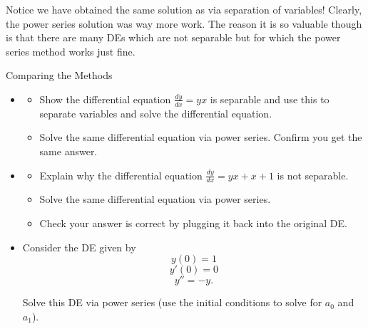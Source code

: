 Notice we have obtained the same solution as via separation of variables!  Clearly, the power series solution was way more work.  The reason it is so valuable though is that there are many DEs which are not separable but for which the power series method works just fine.
\begin{exercise}{Comparing the Methods \Coffeecup \Coffeecup \Coffeecup}
\begin{itemize}
\item \begin{itemize}
\item Show the differential equation $\frac{dy}{dx}=yx$ is separable and use this to separate variables and solve the differential equation.

\vspace*{2in}

\item Solve the same differential equation via power series. Confirm you get the same answer.

\vspace*{2in}

\end{itemize}

\item \begin{itemize} \item Explain why the differential equation $\frac{dy}{dx}=yx+x+1$ is not separable.

\vspace*{1in}

\item Solve the same differential equation via power series.

\vspace*{4in}

\item Check your answer is correct by plugging it back into the original DE.

\vspace*{1in}

\end{itemize}

\item Consider the DE given by $$ y(0)=1 $$ 
$$y'(0)=0 $$
$$ y''=-y.$$

Solve this DE via power series (use the initial conditions to solve for $a_0$ and $a_1$).

\vspace*{4in}

\end{itemize}
\end{exercise}

